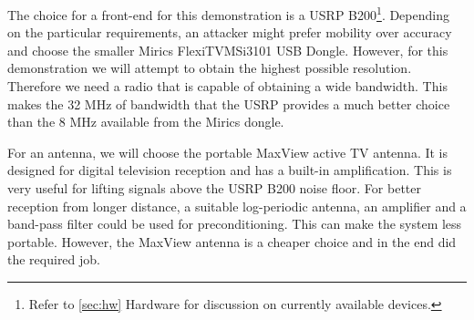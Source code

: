 \documentclass[a4paper,12pt,twoside,openright]{report}
\begin{document}
The choice for a front-end for this demonstration is a USRP B200\footnote{Refer to \ref{sec:hw} Hardware for discussion on currently available devices.}. Depending on the particular requirements, an attacker might prefer mobility over accuracy and choose the smaller Mirics FlexiTV\texttrademark MSi3101 USB Dongle. However, for this demonstration we will attempt to obtain the highest possible resolution. Therefore we need a radio that is capable of obtaining a wide bandwidth. This makes the 32 MHz of bandwidth that the USRP provides a much better choice than the 8 MHz available from the Mirics dongle.

For an antenna, we will choose the portable MaxView active TV antenna. It is designed for digital television reception and has a built-in amplification. This is very useful for lifting signals above the USRP B200 noise floor. For better reception from longer distance, a suitable log-periodic antenna, an amplifier and a band-pass filter could be used for preconditioning. This can make the system less portable. However, the MaxView antenna is a cheaper choice and in the end did the required job.
\end{document}
